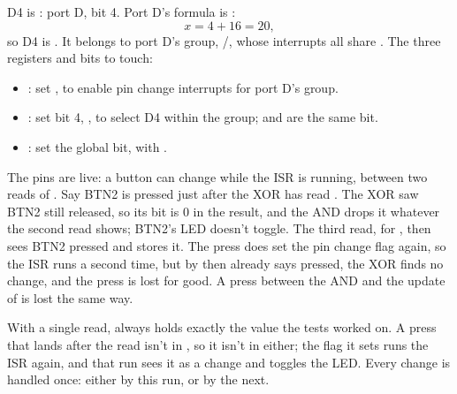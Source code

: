 D4 is : port D, bit 4. Port D's formula is :
\[
  x = 4 + 16 = 20,
\]
so D4 is . It belongs to port D's group, /, whose
interrupts all share . The three registers and bits to touch:
\begin{itemize}
  \item {}: set , to enable pin change interrupts for port D's group.
  \item {}: set bit 4, , to select D4 within the group;
     and  are the same bit.
  \item {}: set the global  bit, with .
\end{itemize}

The pins are live: a button can change while the ISR is running, between two reads of
. Say BTN2 is pressed just after the XOR has read . The XOR saw BTN2 still
released, so its bit is 0 in the result, and the AND drops it whatever the second read shows; BTN2's
LED doesn't toggle. The third read, for , then sees BTN2 pressed and stores it. The press
does set the pin change flag again, so the ISR runs a second time, but by then  already
says pressed, the XOR finds no change, and the press is lost for good. A press between the AND and
the update of  is lost the same way.

With a single read,  always holds exactly the value the tests worked on. A press that
lands after the read isn't in , so it isn't in  either; the flag it sets runs
the ISR again, and that run sees it as a change and toggles the LED. Every change is handled once:
either by this run, or by the next.
